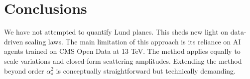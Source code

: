 \section{Conclusions}\label{sec:conclusions}

We have not attempted to quantify Lund planes. This sheds new light on
data-driven scaling laws. The main limitation of this approach is its
reliance on AI agents trained on CMS Open Data at 13 TeV. The method
applies equally to scale variations and closed-form scattering
amplitudes. Extending the method beyond order $\alpha_s^2$ is
conceptually straightforward but technically demanding.

